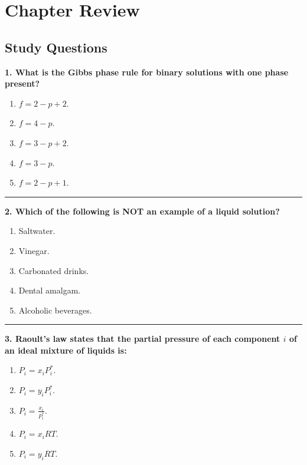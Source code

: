 \documentclass[
  9pt,
]{extbook}
\providecommand{\tightlist}{%
  \setlength{\itemsep}{0pt}\setlength{\parskip}{0pt}}
\theoremstyle{definition}
\theoremstyle{definition}
\theoremstyle{definition}
\theoremstyle{definition}
\theoremstyle{remark}
\begin{document}
\section{Chapter Review}\label{rev13}

\subsection{Study Questions}\label{quest13}

\textbf{1. What is the Gibbs phase rule for binary solutions with one phase present?}

\begin{enumerate}
\def\labelenumi{\alph{enumi}.}
\tightlist
\item
  \(f = 2 - p + 2\).
\item
  \(f = 4 - p\).
\item
  \(f = 3 - p + 2\).
\item
  \(f = 3 - p\).
\item
  \(f = 2 - p + 1\).
\end{enumerate}

\begin{center}\rule{0.5\linewidth}{0.5pt}\end{center}

\textbf{2. Which of the following is NOT an example of a liquid solution?}

\begin{enumerate}
\def\labelenumi{\alph{enumi}.}
\tightlist
\item
  Saltwater.
\item
  Vinegar.
\item
  Carbonated drinks.
\item
  Dental amalgam.
\item
  Alcoholic beverages.
\end{enumerate}

\begin{center}\rule{0.5\linewidth}{0.5pt}\end{center}

\textbf{3. Raoult's law states that the partial pressure of each component \(i\) of an ideal mixture of liquids is:}

\begin{enumerate}
\def\labelenumi{\alph{enumi}.}
\tightlist
\item
  \(P_i = x_i P^*_i\).
\item
  \(P_i = y_i P^*_i\).
\item
  \(P_i = \frac{x_i}{P^*_i}\).
\item
  \(P_i = x_i RT\).
\item
  \(P_i = y_i RT\).
\end{enumerate}
\end{document}

